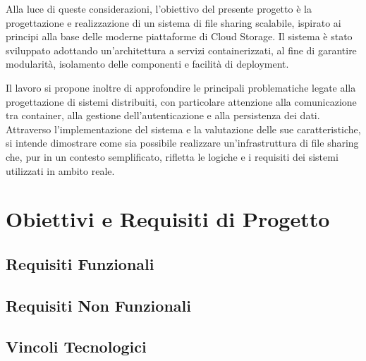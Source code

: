 \documentclass[12pt,a4paper]{report}
\begin{document}
Alla luce di queste considerazioni, l'obiettivo del presente progetto
è la progettazione e realizzazione di un sistema di file sharing
scalabile, ispirato ai principi alla base delle moderne piattaforme
di Cloud Storage. Il sistema è stato sviluppato adottando
un'architettura a servizi containerizzati, al fine di garantire
modularità, isolamento delle componenti e facilità di deployment.

Il lavoro si propone inoltre di approfondire le principali
problematiche legate alla progettazione di sistemi distribuiti, con
particolare attenzione alla comunicazione tra container, alla gestione
dell'autenticazione e alla persistenza dei dati. Attraverso
l'implementazione del sistema e la valutazione delle sue
caratteristiche, si intende dimostrare come sia possibile realizzare
un'infrastruttura di file sharing che, pur in un contesto semplificato,
rifletta le logiche e i requisiti dei sistemi utilizzati in ambito
reale.

\tableofcontents

\cleardoublepage
{}
\setcounter{page}{1}

\chapter{Obiettivi e Requisiti di Progetto}
\label{cap:obiettivi}

\section{Requisiti Funzionali}

\section{Requisiti Non Funzionali}

\section{Vincoli Tecnologici}
\end{document}
